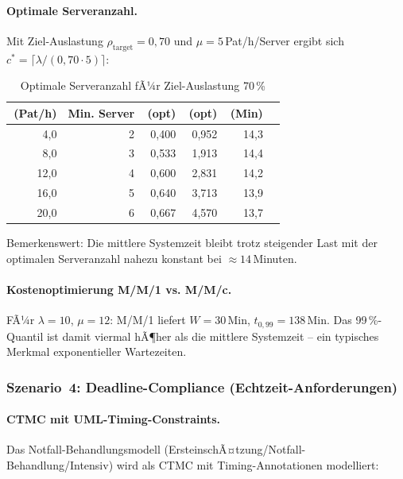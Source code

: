 ﻿\documentclass[a4paper,12pt]{scrreprt}
\theoremstyle{definition}
\begin{document}
\paragraph{Optimale Serveranzahl.}
Mit Ziel-Auslastung $\rho_\text{target} = 0{,}70$ und $\mu = 5$\,Pat/h/Server
ergibt sich $c^* = \lceil \lambda / (0{,}70 \cdot 5) \rceil$:

\begin{table}[H]
	\centering
	\begin{tabular}{@{}rrrrrr@{}}
		\toprule
		\boldmath{$\lambda$}\,{\small(Pat/h)} & \textbf{Min. Server} & \boldmath{$\rho$}\,{\small(opt)} &
		\boldmath{$L$}\,{\small(opt)} & \boldmath{$W$}\,{\small(Min)} \\
		\midrule
		4{,}0 & 2 & 0{,}400 & 0{,}952 & 14{,}3 \\
		8{,}0 & 3 & 0{,}533 & 1{,}913 & 14{,}4 \\
		12{,}0 & 4 & 0{,}600 & 2{,}831 & 14{,}2 \\
		16{,}0 & 5 & 0{,}640 & 3{,}713 & 13{,}9 \\
		20{,}0 & 6 & 0{,}667 & 4{,}570 & 13{,}7 \\
		\bottomrule
	\end{tabular}
	\caption{Optimale Serveranzahl fÃ¼r Ziel-Auslastung 70\,\%}
	\label{tab:capacity-planning}
\end{table}

Bemerkenswert: Die mittlere Systemzeit bleibt trotz steigender Last mit der
optimalen Serveranzahl nahezu konstant bei $\approx 14$\,Minuten.

\paragraph{Kostenoptimierung M/M/1 vs. M/M/c.}
FÃ¼r $\lambda = 10$, $\mu = 12$: M/M/1 liefert $W = 30$\,Min,
$t_{0{,}99} = 138$\,Min. Das 99\,\%-Quantil ist damit viermal hÃ¶her
als die mittlere Systemzeit -- ein typisches Merkmal exponentieller Wartezeiten.

\subsubsection{Szenario~4: Deadline-Compliance (Echtzeit-Anforderungen)}

\paragraph{CTMC mit UML-Timing-Constraints.}
Das Notfall-Behandlungsmodell (ErsteinschÃ¤t\-zung/Notfall-Behandlung/Intensiv)
wird als CTMC mit Timing-Annotationen modelliert:
\end{document}
